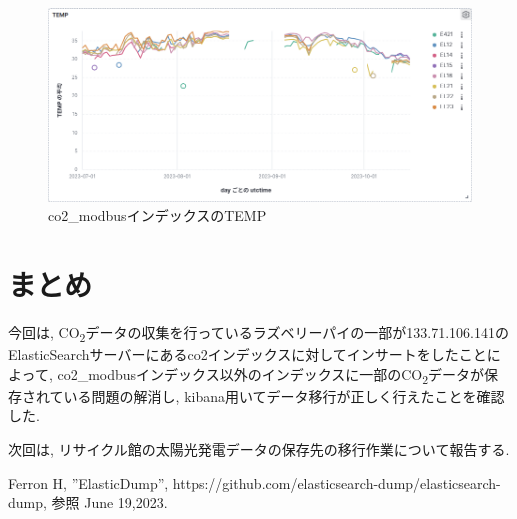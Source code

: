 \documentclass[a4j,12pt,]{jarticle}
\begin{document}
\begin{figure}[H]
  \begin{center}
    \includegraphics[width=160mm]{co2ModbusTemp.png}
    \caption{co2\_modbusインデックスのTEMP}
    \label{p7}
  \end{center}
\end{figure}

\section{まとめ}
今回は, CO\textsubscript{2}データの収集を行っているラズベリーパイの一部が133.71.106.141のElasticSearchサーバーにあるco2インデックスに対してインサートをしたことによって, co2\_modbusインデックス以外のインデックスに一部のCO\textsubscript{2}データが保存されている問題の解消し, kibana用いてデータ移行が正しく行えたことを確認した.

次回は, リサイクル館の太陽光発電データの保存先の移行作業について報告する.

\begin{thebibliography}{5}
  Ferron H, ”ElasticDump”, https://github.com/elasticsearch-dump/elasticsearch-dump, 参照 June 19,2023.
\end{thebibliography}
\end{document}
